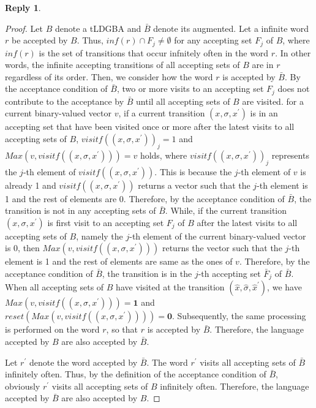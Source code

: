 \documentclass[10 pt, dvipdfmx]{article}
\theoremstyle{definition}
\newtheorem{review point}{Review Point}[section]
\newtheorem*{reply}{Reply}
\begin{document}
\begin{reply}
  \begin{proof}
    Let $B$ denote a tLDGBA and $\bar{B}$ denote its augmented. Let a infinite word $r$ be accepted by $B$. Thus, $inf(r) \cap F_j \neq \emptyset$ for any accepting set $F_j$ of $B$, where $inf(r)$ is the set of transitions that occur infnitely often in the word $r$. In other words, the infinite accepting transitions of all accepting sets of $B$ are in $r$ regardless of its order. Then, we consider how the word $r$ is accepted by $\bar{B}$. By the acceptance condition of $\bar{B}$, two or more visits to an accepting set $F_j$ does not contribute to the acceptance by $\bar{B}$ until all accepting sets of $B$ are visited. for a current binary-valued vector $v$, if a current transition $(x,\sigma,x^{\prime})$ is in an accepting set that have been visited once or more after the latest visits to all accepting sets of $B$, $visitf((x,\sigma,x^{\prime}))_j = 1$ and $Max(v, visitf((x,\sigma,x^{\prime}))) = v$ holds, where $visitf((x,\sigma,x^{\prime}))_j$ represents the $j$-th element of $visitf((x,\sigma,x^{\prime}))$. This is because the $j$-th element of $v$ is already 1 and $visitf((x,\sigma,x^{\prime}))$ returns a vector such that the $j$-th element is 1 and the rest of elements are 0. Therefore, by the acceptance condition of $\bar{B}$, the transition is not in any accepting sets of $\bar{B}$.
    While, if the current transition $(x,\sigma,x^{\prime})$ is first visit to an accepting set $F_j$ of $B$ after the latest visits to all accepting sets of $B$, namely the $j$-th element of the current binary-valued vector is $0$, then $Max(v, visitf((x,\sigma,x^{\prime})))$ returns the vector such that the $j$-th element is 1 and the rest of elements are same as the ones of $v$. Therefore, by the acceptance condition of $\bar{B}$, the transition is in the $j$-th accepting set $\bar{F}_j$ of $\bar{B}$.
    When all accepting sets of $B$ have visited at the transition $(\hat{x},\hat{\sigma},\hat{x}^{\prime})$, we have $Max(v, visitf((x,\sigma,x^{\prime}))) = \bm{1}$ and $reset(Max(v, visitf((x,\sigma,x^{\prime})))) = \bm{0}$. Subsequently, the same processing is performed on the word $r$, so that $r$ is accepted by $\bar{B}$. Therefore, the language accepted by $B$ are also accepted by $\bar{B}$.

    Let $r^{\prime}$ denote the word accepted by $\bar{B}$. The word $r^{\prime}$ visits all accepting sets of $\bar{B}$ infinitely often. Thus, by the definition of the acceptance condition of $\bar{B}$, obviously $r^{\prime}$ visits all accepting sets of $B$ infinitely often. Therefore, the language accepted by $\bar{B}$ are also accepted by $B$.
  \end{proof}
\end{reply}
\end{document}
